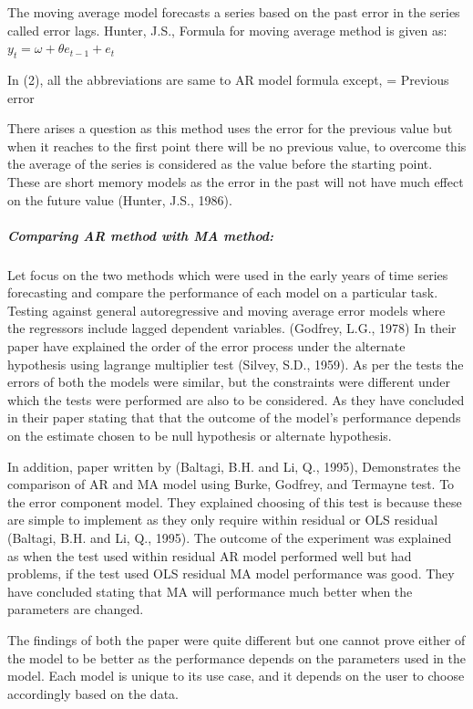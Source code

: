 \documentclass[
  letterpaper,
  DIV=11,
  numbers=noendperiod]{scrartcl}
\let\oldsubparagraph\subparagraph
\renewcommand{\subparagraph}[1]{\oldsubparagraph{#1}\mbox{}}
\begin{document}
The moving average model forecasts a series based on the past error in
the series called error lags. Hunter, J.S., Formula for moving average
method is given as:\(y_{t} = \omega + \theta e _{t-1}+ e_{t}\)

In (2), all the abbreviations are same to AR model formula except, =
Previous error

There arises a question as this method uses the error for the previous
value but when it reaches to the first point there will be no previous
value, to overcome this the average of the series is considered as the
value before the starting point. These are short memory models as the
error in the past will not have much effect on the future value (Hunter,
J.S., 1986).

\hypertarget{comparing-ar-method-with-ma-method}{%
\subparagraph{\texorpdfstring{\textbf{Comparing AR method with MA
method:}}{Comparing AR method with MA method:}}\label{comparing-ar-method-with-ma-method}}

Let focus on the two methods which were used in the early years of time
series forecasting and compare the performance of each model on a
particular task. Testing against general autoregressive and moving
average error models where the regressors include lagged dependent
variables. (Godfrey, L.G., 1978) In their paper have explained the order
of the error process under the alternate hypothesis using lagrange
multiplier test (Silvey, S.D., 1959). As per the tests the errors of
both the models were similar, but the constraints were different under
which the tests were performed are also to be considered. As they have
concluded in their paper stating that that the outcome of the model's
performance depends on the estimate chosen to be null hypothesis or
alternate hypothesis.

In addition, paper written by (Baltagi, B.H. and Li, Q., 1995),
Demonstrates the comparison of AR and MA model using Burke, Godfrey, and
Termayne test. To the error component model. They explained choosing of
this test is because these are simple to implement as they only require
within residual or OLS residual (Baltagi, B.H. and Li, Q., 1995). The
outcome of the experiment was explained as when the test used within
residual AR model performed well but had problems, if the test used OLS
residual MA model performance was good. They have concluded stating that
MA will performance much better when the parameters are changed.

The findings of both the paper were quite different but one cannot prove
either of the model to be better as the performance depends on the
parameters used in the model. Each model is unique to its use case, and
it depends on the user to choose accordingly based on the data.
\end{document}
